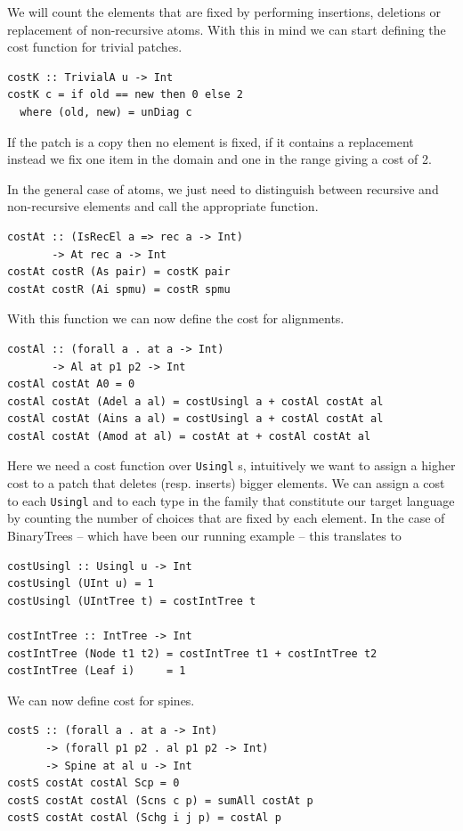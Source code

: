 \documentclass[11pt, titlepage]{article}
\newcommand{\toHaskell}[1]{\texttt{#1}\xspace}
\begin{document}
We will count the elements that are fixed by performing insertions, deletions or replacement of non-recursive atoms. 
With this in mind we can start defining the cost function for trivial patches.

\begin{verbatim}
costK :: TrivialA u -> Int
costK c = if old == new then 0 else 2
  where (old, new) = unDiag c
\end{verbatim}

If the patch is a copy then no element is fixed, if it contains a replacement instead we fix one item in the domain and one in the range giving a cost of 2.

In the general case of atoms, we just need to distinguish between recursive and non-recursive elements and call the appropriate function.

\begin{verbatim}
costAt :: (IsRecEl a => rec a -> Int)
       -> At rec a -> Int
costAt costR (As pair) = costK pair
costAt costR (Ai spmu) = costR spmu
\end{verbatim}
With this function we can now define the cost for alignments.

\begin{verbatim}
costAl :: (forall a . at a -> Int)
       -> Al at p1 p2 -> Int
costAl costAt A0 = 0
costAl costAt (Adel a al) = costUsingl a + costAl costAt al
costAl costAt (Ains a al) = costUsingl a + costAl costAt al
costAl costAt (Amod at al) = costAt at + costAl costAt al
\end{verbatim}

Here we need a cost function over \toHaskell{Usingl}s, intuitively we want to assign a higher cost to a patch that deletes (resp. inserts) bigger elements. We can assign a cost to each \toHaskell{Usingl} and to each type in the family that constitute our target language by counting the number of choices that are fixed by each element. In the case of BinaryTrees -- which have been our running example -- this translates to

\begin{verbatim}
costUsingl :: Usingl u -> Int
costUsingl (UInt u) = 1
costUsingl (UIntTree t) = costIntTree t

costIntTree :: IntTree -> Int
costIntTree (Node t1 t2) = costIntTree t1 + costIntTree t2
costIntTree (Leaf i)     = 1
\end{verbatim}

We can now define cost for spines.

\begin{verbatim}
costS :: (forall a . at a -> Int)
      -> (forall p1 p2 . al p1 p2 -> Int)
      -> Spine at al u -> Int
costS costAt costAl Scp = 0
costS costAt costAl (Scns c p) = sumAll costAt p
costS costAt costAl (Schg i j p) = costAl p
\end{verbatim}
\end{document}
